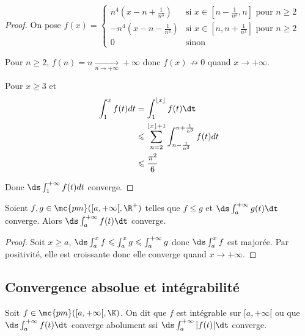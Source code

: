 \begin{proof}
    On pose $f(x) = \begin{cases}
        n^4\left( x - n + \frac 1 {n^3} \right) & \text{si } x \in \left[ n - \frac 1 {n^3}, n \right] \text{ pour } n \geqslant 2 \\
        -n^4\left( x - n - \frac 1 {n^3} \right) & \text{si } x \in \left[ n, n + \frac 1 {n^3} \right] \text{ pour } n \geqslant 2 \\
        0 & \text{sinon}
    \end{cases}$

    Pour $n \geqslant 2$, $f(n) = n \xrightarrow[n \to + \infty   ]{} + \infty$ donc 
    $f(x) \nrightarrow 0$ quand $x \to + \infty$.

    Pour $x \geqslant 3$ et 
    \begin{align}
        \int_1^x f(t) dt &= \int_{1}^{\lfloor x \rfloor} f(t) \dt \\
        & \leqslant \sum_{n=2}^{\lfloor x \rfloor + 1} \int_{n - \frac 1 {n^3}}^{n + \frac 1 {n^3}} f(t) dt \\
        & \leqslant \frac{\pi^2}{6}
    \end{align}

    Donc $\ds \int_1^{+ \infty} f(t) dt$ converge.
\end{proof}

\begin{theoreme}{}{}
    Soient $f, g \in \mc{pm}([a, + \infty[, \R^+)$ telles que $f \leqslant g$ et 
    $\ds \int_a^{+ \infty} g(t) \dt$ converge. Alors $\ds \int_a^{+ \infty} f(t) \dt$ converge.
\end{theoreme}

\begin{proof}
    Soit $x \geqslant a$, $\ds \int_a^x f \leqslant \int_a^x g \leqslant \int_a^{+ \infty} g$ donc
    $\ds \int_a^x f$ est majorée. Par positivité, elle est croissante donc
    elle converge quand $x \to + \infty$.
\end{proof}

\subsection{Convergence absolue et intégrabilité}

\begin{definition}{}{}
    Soit $f \in \mc{pm}([a, + \infty[, \K)$. On dit que $f$ est intégrable sur $[a, + \infty[$
    ou que $\ds \int_a^{+ \infty} f(t) \dt$ converge abolument ssi $\ds \int_a^{+ \infty} |f(t)| \dt$ converge.
\end{definition}


